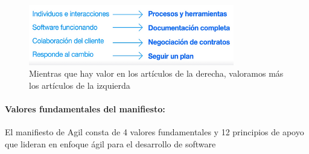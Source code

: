 \documentclass[12pt, letterpaper]{article}
\begin{document}
\vspace{10pt} %

\begin{figure}[ht] %
    \centering
    \includegraphics[width=0.8\textwidth]{imagenes/manifiesto_agil.png}
    \caption{Mientras que hay valor en los artículos de la derecha, valoramos más los artículos de la izquierda}
    \label{fig:manifiesto_agil}
  \end{figure}

\vspace{10pt} %

\paragraph{Valores fundamentales del manifiesto:} El manifiesto de Agil consta de 4 valores fundamentales y 
12 principios de apoyo que lideran en enfoque ágil 
para el desarrollo de software

\end{document}
